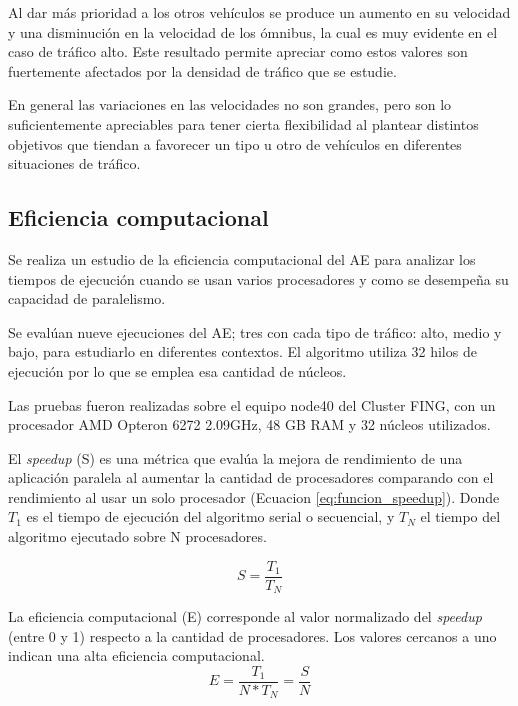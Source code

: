 Al dar más prioridad a los otros vehículos se produce un aumento en su velocidad y una disminución en la velocidad de los ómnibus, la cual es muy evidente en el caso de tráfico alto. Este resultado permite apreciar como estos valores son fuertemente afectados por la densidad de tráfico que se estudie.

En general las variaciones en las velocidades no son grandes, pero son lo suficientemente apreciables para tener cierta flexibilidad al plantear distintos objetivos que tiendan a favorecer un tipo u otro de vehículos en diferentes situaciones de tráfico.


\subsection{Eficiencia computacional}

Se realiza un estudio de la eficiencia computacional del AE para analizar los tiempos de ejecución cuando se usan varios procesadores y como se desempeña su capacidad de paralelismo.

Se evalúan nueve ejecuciones del AE; tres con cada tipo de tráfico: alto, medio y bajo, para estudiarlo en diferentes contextos. El algoritmo utiliza 32 hilos de ejecución por lo que se emplea esa cantidad de núcleos.

Las pruebas fueron realizadas sobre el equipo node40 del Cluster FING, con un procesador AMD Opteron 6272 2.09GHz, 48 GB RAM y 32 núcleos utilizados.

El \emph{speedup} (S) es una métrica que evalúa la mejora de rendimiento de una aplicación paralela al aumentar la cantidad de procesadores comparando con el rendimiento al usar un solo procesador (Ecuacion \ref{eq:funcion_speedup}). Donde ${T_1}$ es el tiempo de ejecución del algoritmo serial o secuencial, y ${T_N}$ el tiempo del algoritmo ejecutado sobre N procesadores.

\begin{equation}
\label{eq:funcion_speedup}
S = \frac{T_1}{T_N}
\end{equation}



La eficiencia computacional (E) corresponde al valor normalizado del \emph{speedup} (entre 0 y 1) respecto a la cantidad de procesadores. Los valores cercanos a uno indican una alta eficiencia computacional.
\begin{equation}
\label{eq:funcion_eficiencia}
E = \frac{T_1}{N*T_N} = \frac{S}{N}
\end{equation}

